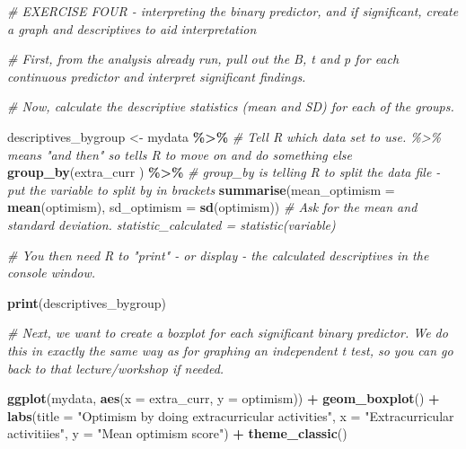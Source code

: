 \documentclass[
]{book}
\newenvironment{Shaded}{\begin{snugshade}}{\end{snugshade}}
\newcommand{\AttributeTok}[1]{\textcolor[rgb]{0.13,0.29,0.53}{#1}}
\newcommand{\CommentTok}[1]{\textcolor[rgb]{0.56,0.35,0.01}{\textit{#1}}}
\newcommand{\FunctionTok}[1]{\textcolor[rgb]{0.13,0.29,0.53}{\textbf{#1}}}
\newcommand{\NormalTok}[1]{#1}
\newcommand{\OtherTok}[1]{\textcolor[rgb]{0.56,0.35,0.01}{#1}}
\newcommand{\SpecialCharTok}[1]{\textcolor[rgb]{0.81,0.36,0.00}{\textbf{#1}}}
\newcommand{\StringTok}[1]{\textcolor[rgb]{0.31,0.60,0.02}{#1}}
\begin{document}
\begin{Shaded}
\begin{Highlighting}[]
\CommentTok{\# EXERCISE FOUR {-} interpreting the binary predictor, and if significant, create a graph and descriptives to aid interpretation}

\CommentTok{\# First, from the analysis already run, pull out the B, t and p for each continuous predictor and interpret significant findings.}

\CommentTok{\# Now, calculate the descriptive statistics (mean and SD) for each of the groups.}

\NormalTok{descriptives\_bygroup }\OtherTok{\textless{}{-}}\NormalTok{ mydata }\SpecialCharTok{\%\textgreater{}\%} \CommentTok{\# Tell R which data set to use.  \%\textgreater{}\% means "and then" so tells R to move on and do something else}
  \FunctionTok{group\_by}\NormalTok{(extra\_curr ) }\SpecialCharTok{\%\textgreater{}\%} \CommentTok{\# group\_by is telling R to split the data file {-} put the variable to split by in brackets}
  \FunctionTok{summarise}\NormalTok{(}\AttributeTok{mean\_optimism =} \FunctionTok{mean}\NormalTok{(optimism), }\AttributeTok{sd\_optimism =} \FunctionTok{sd}\NormalTok{(optimism)) }\CommentTok{\# Ask for the mean and standard deviation. statistic\_calculated = statistic(variable)}

\CommentTok{\# You then need R to "print" {-} or display {-} the calculated descriptives in the console window.}

\FunctionTok{print}\NormalTok{(descriptives\_bygroup)}

\CommentTok{\# Next, we want to create a boxplot for each significant binary predictor. We do this in exactly the same way as for graphing an independent t test, so you can go back to that lecture/workshop if needed.}

\FunctionTok{ggplot}\NormalTok{(mydata, }\FunctionTok{aes}\NormalTok{(}\AttributeTok{x =}\NormalTok{ extra\_curr, }\AttributeTok{y =}\NormalTok{ optimism)) }\SpecialCharTok{+}
  \FunctionTok{geom\_boxplot}\NormalTok{() }\SpecialCharTok{+}
  \FunctionTok{labs}\NormalTok{(}\AttributeTok{title =} \StringTok{"Optimism by doing extracurricular activities"}\NormalTok{,}
       \AttributeTok{x =} \StringTok{"Extracurricular activitiies"}\NormalTok{,}
       \AttributeTok{y =} \StringTok{"Mean optimism score"}\NormalTok{) }\SpecialCharTok{+}
  \FunctionTok{theme\_classic}\NormalTok{()}
\end{Highlighting}
\end{Shaded}
\end{document}

